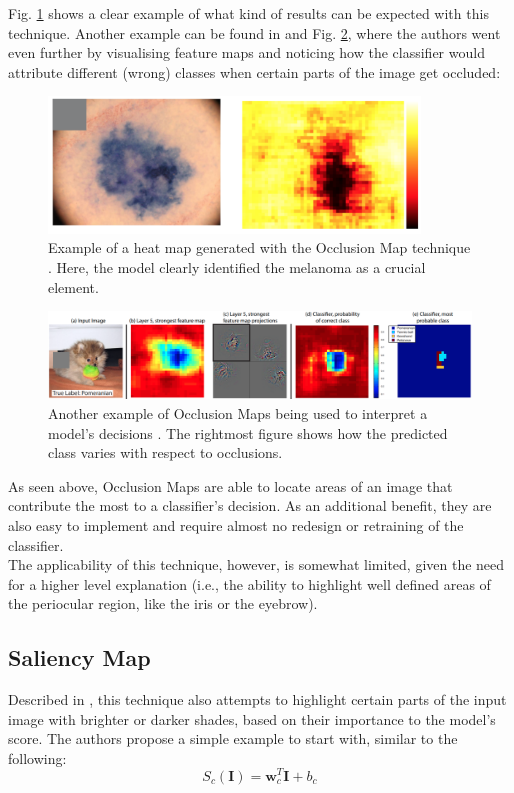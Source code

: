 Fig. \ref{fig:occlusion_map_1} shows a clear example of what kind of results can be expected with this technique. Another example can be found in \cite{occlusion_maps} and Fig. \ref{fig:occlusion_map_2}, where the authors went even further by visualising feature maps and noticing how the classifier would attribute different (wrong) classes when certain parts of the image get occluded:

\begin{figure}[h]
\centering
\includegraphics[width=280pt]{figures/figure_19.pdf}
\caption{Example of a heat map generated with the Occlusion Map technique \cite{occlusion_maps_linkedin}. Here, the model clearly identified the melanoma as a crucial element.}
\label{fig:occlusion_map_1}
\end{figure}

\begin{figure}[h]
\centering
\includegraphics[width=390pt]{figures/figure_20.pdf}
\caption{Another example of Occlusion Maps being used to interpret a model's decisions \cite{occlusion_maps}. The rightmost figure shows how the predicted class varies with respect to occlusions.}
\label{fig:occlusion_map_2}
\end{figure}

As seen above, Occlusion Maps are able to locate areas of an image that contribute the most to a classifier's decision. As an additional benefit, they are also easy to implement and require almost no redesign or retraining of the classifier.\\

The applicability of this technique, however, is somewhat limited, given the need for a higher level explanation (i.e., the ability to highlight well defined areas of the periocular region, like the iris or the eyebrow).

\subsection{Saliency Map}
\label{subsec:chap2_saliency_map}
Described in \cite{saliency_maps}, this technique also attempts to highlight certain parts of the input image with brighter or darker shades, based on their importance to the model's score. The authors propose a simple example to start with, similar to the following:
\begin{equation}
    S_{c}(\mathbf{I}) = \mathbf{w}_{c}^{T} \mathbf{I} + b_{c}
    \label{eq:9}
\end{equation}


